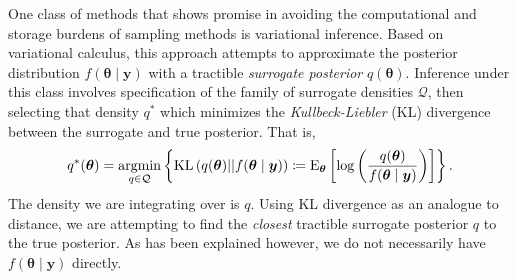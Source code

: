 

One class of methods that shows promise in avoiding the computational and storage
    burdens of sampling methods is variational inference.  Based on variational
    calculus, this approach attempts to approximate the posterior distribution
    $f(\bm{\theta}\mid\bm{y})$ with a tractible \emph{surrogate posterior} 
    $q(\bm{\theta})$.  Inference under this class involves specification of the
    family of surrogate densities $\mathcal{Q}$, then selecting that density 
    $q^*$ which minimizes the \emph{Kullbeck-Liebler} (KL) divergence between 
    the surrogate and true posterior.  That is,
    \[
        q^*(\bm{\theta}) = \operatorname*{argmin}_{q\in\mathcal{Q}}\left\lbrace
        \text{KL}\left(q(\bm{\theta})||f(\bm{\theta}\mid\bm{y})\right) 
        \coloneqq
        \text{E}_{\bm{\theta}}\left[\log\left(
        \frac{q(\bm{\theta})}{f(\bm{\theta}\mid\bm{y})}
        \right)\right]
        \right\rbrace.
    \]
    The density we are integrating over is $q$.
    Using KL divergence as an analogue to distance, we are attempting to find
    the \emph{closest} tractible surrogate posterior $q$ to the true posterior.
    As has been explained however, we do not necessarily have $f(\bm{\theta}\mid\bm{y})$ 
    directly.

    
    
    











